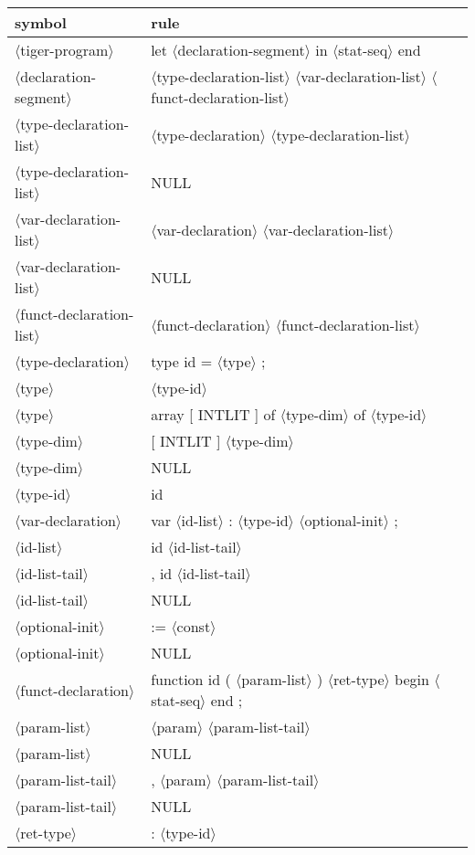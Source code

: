 \documentclass[11pt, fleqn]{article}
\newcommand{\atag}[1]{$\langle$#1$\rangle$}
\begin{document}
\begin{longtable}{l|l}
symbol							&	rule								\\
\hline
\atag{tiger-program}				&	let \atag{declaration-segment} in \atag{stat-seq} end				\\
\atag{declaration-segment}		&	\atag{type-declaration-list}	\atag{var-declaration-list} \atag{funct-declaration-list}	\\
\atag{type-declaration-list}		&	\atag{type-declaration} \atag{type-declaration-list}	\\
\atag{type-declaration-list}		&	NULL		\\
\atag{var-declaration-list}		&	\atag{var-declaration} \atag{var-declaration-list}	\\
\atag{var-declaration-list}		&	NULL		\\
\atag{funct-declaration-list}	&	\atag{funct-declaration} \atag{funct-declaration-list}	\\
\atag{type-declaration}			&	type id = \atag{type} ;		\\
\atag{type}						&	\atag{type-id}		\\
\atag{type}						&	array [ INTLIT ] of \atag{type-dim} of \atag{type-id}	\\
\atag{type-dim}					&	[ INTLIT ] \atag{type-dim}	\\
\atag{type-dim}					&	NULL		\\
\atag{type-id}					&	id		\\
\atag{var-declaration}			&	var \atag{id-list} : \atag{type-id} \atag{optional-init} ;		\\
\atag{id-list}					&	id \atag{id-list-tail}		\\
\atag{id-list-tail}				&	, id \atag{id-list-tail}		\\
\atag{id-list-tail}				&	NULL		\\
\atag{optional-init}				&	:= \atag{const}		\\
\atag{optional-init}				&	NULL		\\
\atag{funct-declaration}			&	function id ( \atag{param-list} ) \atag{ret-type} begin \atag{stat-seq} end ;	\\
\atag{param-list}				&	\atag{param}	 \atag{param-list-tail}	\\
\atag{param-list}				&	NULL		\\
\atag{param-list-tail}			&	, \atag{param} \atag{param-list-tail}		\\
\atag{param-list-tail}			&	NULL		\\
\atag{ret-type}					&	: \atag{type-id}		\\

\end{longtable}
\end{document}
